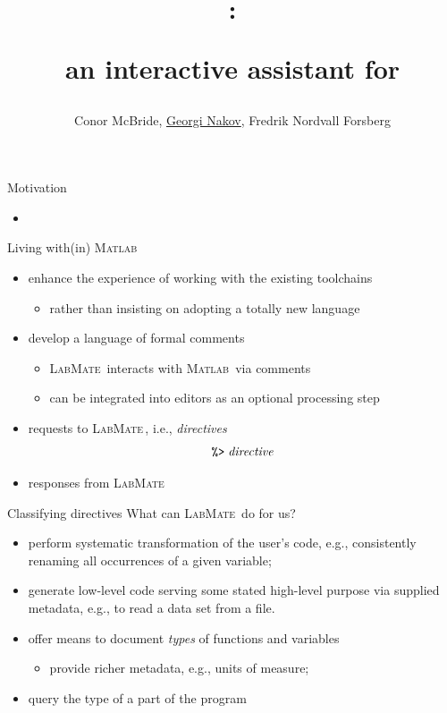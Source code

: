 \documentclass[handout]{beamer}
\title{\huge \lr: \\ \centerline{an interactive assistant for \ma} }
\author[McBride, Nakov, Nordvall Forsberg]{\small Conor McBride, \underline{Georgi Nakov}, Fredrik Nordvall Forsberg}
\institute[]{University of Strathclyde}
\newcommand{\pct}{\texttt{\symbol{37}}}
\newcommand{\dir}{\texttt{\symbol{62}}}
\newcommand{\lr}{\textsc{LabMate}}
\newcommand{\ma}{\textsc{Matlab}}
\begin{document}
\begin{frame}
  \titlepage
\end{frame}

\begin{frame}{Motivation}
\begin{itemize}
 \item %
\end{itemize}

\end{frame}

\begin{frame}{Living with(in) \ma}
\begin{itemize}
  \item enhance the experience of working with the existing toolchains
  \begin{itemize}
    \item rather than insisting on adopting a totally new language
  \end{itemize}
  \item develop a language of formal comments
  \begin{itemize}
    \item \lr\ interacts with \ma\ via comments
    \item can be integrated into editors as an optional processing step
  \end{itemize}
  \item requests to \lr\,, i.e., \emph{directives}
  \[\pct\dir\;\mathit{directive}\]
  \item responses from \lr
\end{itemize}
\end{frame}

\begin{frame}{Classifying directives}
  What can \lr\ do for us?
\begin{itemize}
  \item perform systematic transformation of the user's code, e.g., consistently renaming all occurrences of a given variable;
  \item generate low-level code serving some stated high-level purpose via supplied metadata, e.g., to read a data set from a file.
  \item offer means to document \emph{types} of functions and variables
  \begin{itemize}
    \item provide richer metadata, e.g., units of measure;
  \end{itemize}
  \item query the type of a part of the program
\end{itemize}
\end{frame}
\end{document}
